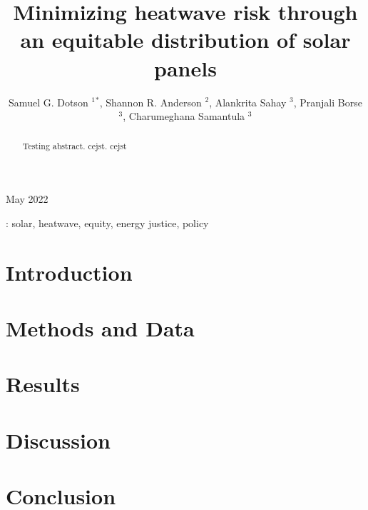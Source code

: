 \documentclass[10pt]{iopart}
\begin{document}
\title[Minimizing heatwave risk through an equitable distribution of solar panels]{Minimizing 
heatwave risk through an equitable distribution of solar panels}
 
 \author{
 Samuel G. Dotson $^1$$^*$, 
 Shannon R. Anderson $^2$, 
 Alankrita Sahay $^3$,
 Pranjali Borse  $^3$,
 Charumeghana Samantula  $^3$
 }
 
 \address{ $^1$ Department of Nuclear, Plasma, and Radiological Engineering, 
 University of Illinois Urbana-Champaign, Urbana IL, United States}
  \address{ $^2$ Department of  Natural Resources and Environmental Sciences, 
 University of Illinois Urbana-Champaign, Urbana IL, United States}
  \address{ $^3$ Department of Civil and Environmental Engineering, 
 University of Illinois Urbana-Champaign, Urbana IL, United States}
 \address{$^*$ Author to whom correspondence should be addressed}
 
 
 \begin{indented}
 \vspace{10pt}
 \item[]May 2022
 \end{indented}

 \begin{abstract}
 Testing abstract. \ac{cejst}. \ac{cejst}
 \end{abstract}
 
 \vspace{2pc}
: solar, heatwave, equity, energy justice, policy

\ioptwocol

\section{Introduction}

\section{Methods and Data}

\section{Results}

\section{Discussion}

\section{Conclusion}
 
 
\end{document}
